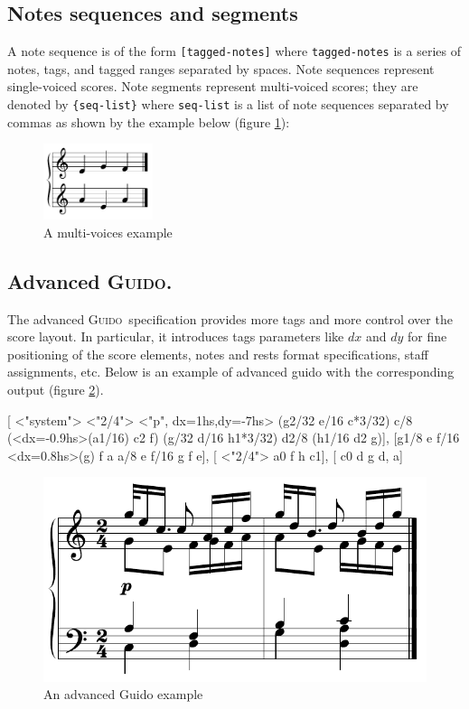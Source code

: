 \documentclass[twoside,10pt,a4paper]{article}
\newenvironment{gmncode}		{\vspace{-2mm}\small\verbatim}{\endverbatim\vspace{-2mm}}
\newcommand{\Guido}		{\textsc{Guido}}
\newcommand{\code}[1]		{{\small \texttt{#1}}}
\newcommand{\codeindent}	{\\ \hspace*{9mm}}
\begin{document}
\subsection{Notes sequences and segments}
A note sequence is of the form \verb+[tagged-notes]+ where \code{tagged-notes} is a series of notes, tags, and tagged ranges separated by spaces. Note sequences represent single-voiced scores.
Note segments represent multi-voiced scores; they are denoted by \verb+{seq-list}+ where \code{seq-list} is a list of note sequences separated by commas as shown by the example below (figure \ref{fig:voices}):
\codeindent\code{ \{ [ e g f ], [ a e a ] \} }
\begin{figure}[h]
	\centering \includegraphics[width=32mm]{rsrc/voices}
 \caption{A multi-voices example}
 \label{fig:voices}
\end{figure}


\subsection{Advanced \Guido.}
The advanced \Guido\ specification provides more tags and more control over the score layout.
In particular, it introduces tags parameters like $dx$ and $dy$ for fine positioning of the score elements, notes and rests format specifications, staff assignments, etc. 
Below is an example of advanced guido with the corresponding output (figure \ref{advex}).

\begin{gmncode} 
{
 [
  \barFormat<"system">
   \stemsUp \meter<"2/4"> 
  \intens<"p", dx=1hs,dy=-7hs>
  \beam(g2/32 e/16 c*3/32) c/8 
  \beam(\noteFormat<dx=-0.9hs>(a1/16) c2 f) 
  \beam(g/32 d/16 h1*3/32) d2/8 
  \beam(h1/16 d2 g)],
 [\stemsDown g1/8 e
  f/16 \noteFormat<dx=0.8hs>(g) f a a/8 e 
  f/16 g f e],
 [ \meter<"2/4"> 
  \stemsUp a0 f h c1],
 [ \stemsDown c0 d g {d, a}]
}
\end{gmncode} 

\begin{figure}[h]
	\centering \includegraphics[width=0.85\columnwidth]{rsrc/4voices}
 \caption{An advanced Guido example}
 \label{advex}
\end{figure}
\end{document}
